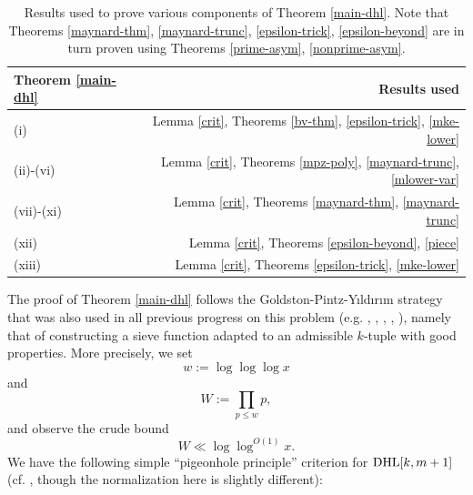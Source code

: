 \begin{table}
\centering
\setlength{\extrarowheight}{2pt}
\caption{Results used to prove various components of Theorem \ref{main-dhl}. Note that Theorems \ref{maynard-thm}, \ref{maynard-trunc}, \ref{epsilon-trick}, \ref{epsilon-beyond} are in turn proven using Theorems \ref{prime-asym}, \ref{nonprime-asym}.}\label{ingredients}
\begin{tabular}{lr}
\toprule
Theorem \ref{main-dhl}                 & Results used \\
\midrule
(i) & Lemma \ref{crit}, Theorems \ref{bv-thm}, \ref{epsilon-trick}, \ref{mke-lower} \\
(ii)-(vi) & Lemma \ref{crit}, Theorems \ref{mpz-poly}, \ref{maynard-trunc}, \ref{mlower-var} \\
(vii)-(xi) & Lemma \ref{crit}, Theorems \ref{maynard-thm}, \ref{maynard-trunc} \\
(xii) & Lemma \ref{crit}, Theorems \ref{epsilon-beyond}, \ref{piece} \\
(xiii) & Lemma \ref{crit}, Theorems \ref{epsilon-trick}, \ref{mke-lower} \\
\bottomrule
\end{tabular}
\end{table}

The proof of Theorem \ref{main-dhl} follows the Goldston-Pintz-Y{\i}ld{\i}r{\i}m strategy that was also used in all previous progress on this problem (e.g. \cite{gpy}, \cite{mp}, \cite{zhang}, \cite{polymath8a}, \cite{maynard-new}), namely that of constructing a sieve function adapted to an admissible $k$-tuple with good properties.  More precisely, we set
$$ w := \log \log \log x$$
and 
$$ W := \prod_{p \leq w} p,$$
and observe the crude bound
\begin{equation}\label{W-bound}
 W \ll \log \log^{O(1)} x.
\end{equation}
We have the following simple ``pigeonhole principle'' criterion for $\operatorname*{DHL}[k,m+1]$ (cf. \cite[Lemma 4.1]{polymath8a}, though the normalization here is slightly different):

